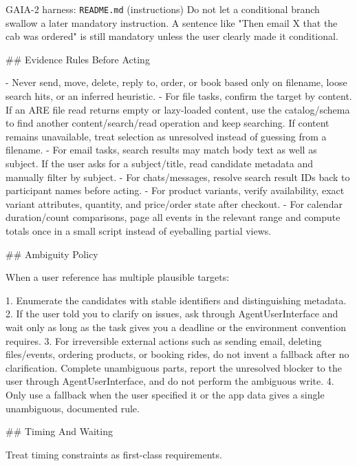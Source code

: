 \documentclass{llmxive}
\begin{document}
\begin{promptbox}{GAIA-2 harness: \texttt{README.md} (instructions)}
Do not let a conditional branch swallow a later mandatory instruction. A sentence like "Then email X that the cab was ordered" is still mandatory unless the user clearly made it conditional.

## Evidence Rules Before Acting

- Never send, move, delete, reply to, order, or book based only on filename, loose search hits, or an inferred heuristic.
- For file tasks, confirm the target by content. If an ARE file read returns empty or lazy-loaded content, use the catalog/schema to find another content/search/read operation and keep searching. If content remains unavailable, treat selection as unresolved instead of guessing from a filename.
- For email tasks, search results may match body text as well as subject. If the user asks for a subject/title, read candidate metadata and manually filter by subject.
- For chats/messages, resolve search result IDs back to participant names before acting.
- For product variants, verify availability, exact variant attributes, quantity, and price/order state after checkout.
- For calendar duration/count comparisons, page all events in the relevant range and compute totals once in a small script instead of eyeballing partial views.

## Ambiguity Policy

When a user reference has multiple plausible targets:

1. Enumerate the candidates with stable identifiers and distinguishing metadata.
2. If the user told you to clarify on issues, ask through AgentUserInterface and wait only as long as the task gives you a deadline or the environment convention requires.
3. For irreversible external actions such as sending email, deleting files/events, ordering products, or booking rides, do not invent a fallback after no clarification. Complete unambiguous parts, report the unresolved blocker to the user through AgentUserInterface, and do not perform the ambiguous write.
4. Only use a fallback when the user specified it or the app data gives a single unambiguous, documented rule.

## Timing And Waiting

Treat timing constraints as first-class requirements.


\end{promptbox}
\end{document}
